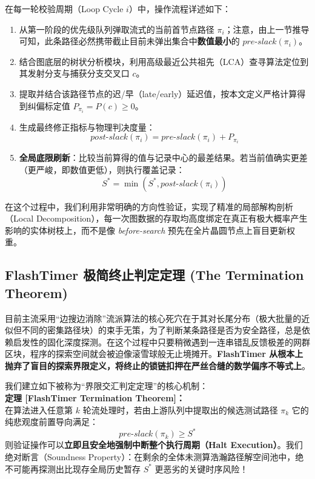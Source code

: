 在每一轮校验周期（Loop Cycle $i$）中，操作流程详述如下：
\begin{enumerate}
    \item 从第一阶段的优先级队列弹取流式的当前首节点路径 $\pi_i$；注意，由上一节推导可知，此条路径必然携带截止目前未弹出集合中\textbf{数值最小}的 $pre\text{-}slack(\pi_i)$。
    \item 结合图底层的树状分析模块，利用高级最近公共祖先（LCA）查寻算法定位到其发射分支与捕获分支交叉口 $c$。
    \item 提取并结合该路径节点的迟/早（late/early）延迟值，按本文定义严格计算得到纠偏标定值 $P_{\pi_i} = P(c) \ge 0$。
    \item 生成最终修正指标与物理判决度量：
    \begin{equation}
        post\text{-}slack(\pi_i) = pre\text{-}slack(\pi_i) + P_{\pi_i}
    \end{equation}
    \item \textbf{全局底限刷新}：比较当前算得的值与记录中心的最差结果。若当前值确实更差（更严峻，即数值更低），则执行覆盖记录：
    \begin{equation}
        S^* = \min(S^*, post\text{-}slack(\pi_i))
    \end{equation}
\end{enumerate}

在这个过程中，我们利用非常明确的方向性验证，实现了精准的局部解构剖析（Local Decomposition），每一次图数据的存取均高度绑定在真正有极大概率产生影响的实体树枝上，而不是像 \textit{before-search} 预先在全片晶圆节点上盲目更新权重。

\subsection{FlashTimer 极简终止判定定理 (The Termination Theorem)}
\label{subsec:termination_theorem}

目前主流采用“边搜边消除”流派算法的核心死穴在于其对长尾分布（极大批量的近似但不同的密集路径块）的束手无策，为了判断某条路径是否为安全路径，总是依赖启发性的固化深度探测。在这个过程中只要稍微遇到一连串错乱反馈极差的网群区块，程序的探索空间就会被迫像滚雪球般无止境摊开。\textbf{FlashTimer 从根本上抛弃了盲目的探索界限定义，将终止的锁链扣押在严丝合缝的数学偏序不等式上}。

我们建立如下被称为“界限交汇判定定理”的核心机制：
\\\textbf{定理 [FlashTimer Termination Theorem]：}\\
在算法进入任意第 $k$ 轮流处理时，若由上游队列中提取出的候选测试路径 $\pi_k$ 它的纯悲观度前置导向满足：
\begin{equation}
    pre\text{-}slack(\pi_k) \ge S^* 
\end{equation}
则验证操作可以\textbf{立即且安全地强制中断整个执行周期（Halt Execution）}。我们绝对断言（Soundness Property）：在剩余的全体未测算浩瀚路径解空间池中，绝不可能再探测出比现存全局历史暂存 $S^*$ 更恶劣的关键时序风险！

